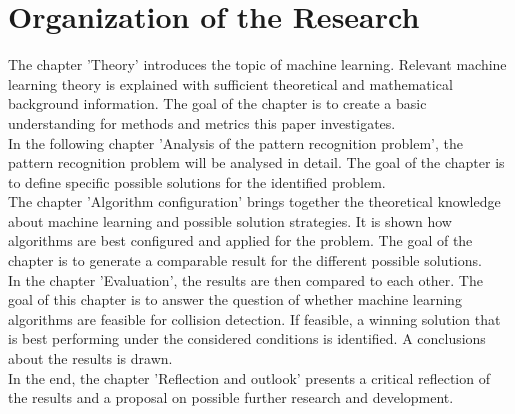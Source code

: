 \section{Organization of the Research}
The chapter 'Theory' introduces the topic of machine learning. Relevant machine learning theory is explained with sufficient theoretical and mathematical background information. The goal of the chapter is to create a basic understanding for methods and metrics this paper investigates.
\\
In the following chapter 'Analysis of the pattern recognition problem', the pattern recognition problem will be analysed in detail. The goal of the chapter is to define specific possible solutions for the identified problem. 
\\
The chapter 'Algorithm configuration' brings together the theoretical knowledge about machine learning and possible solution strategies. It is shown how algorithms are best configured and applied for the problem. The goal of the chapter is to generate a comparable result for the different possible solutions. 
\\
In the chapter 'Evaluation', the results are then compared to each other. The goal of this chapter is to answer the question of whether machine learning algorithms are feasible for collision detection. If feasible, a winning solution that is best performing under the considered conditions is identified. A conclusions about the results is drawn. \\
In the end, the chapter 'Reflection and outlook' presents a critical reflection of the results and a proposal on possible further research and development.